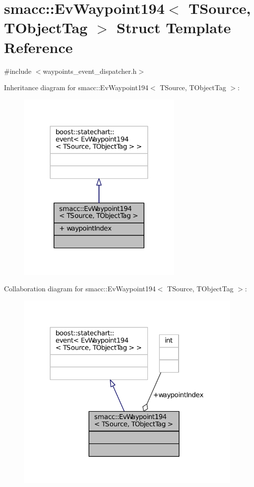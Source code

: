 \hypertarget{structsmacc_1_1EvWaypoint194}{}\section{smacc\+:\+:Ev\+Waypoint194$<$ T\+Source, T\+Object\+Tag $>$ Struct Template Reference}
\label{structsmacc_1_1EvWaypoint194}


{\ttfamily \#include $<$waypoints\+\_\+event\+\_\+dispatcher.\+h$>$}



Inheritance diagram for smacc\+:\+:Ev\+Waypoint194$<$ T\+Source, T\+Object\+Tag $>$\+:
\nopagebreak
\begin{figure}[H]
\begin{center}
\leavevmode
\includegraphics[width=227pt]{structsmacc_1_1EvWaypoint194__inherit__graph}
\end{center}
\end{figure}


Collaboration diagram for smacc\+:\+:Ev\+Waypoint194$<$ T\+Source, T\+Object\+Tag $>$\+:
\nopagebreak
\begin{figure}[H]
\begin{center}
\leavevmode
\includegraphics[width=312pt]{structsmacc_1_1EvWaypoint194__coll__graph}
\end{center}
\end{figure}
